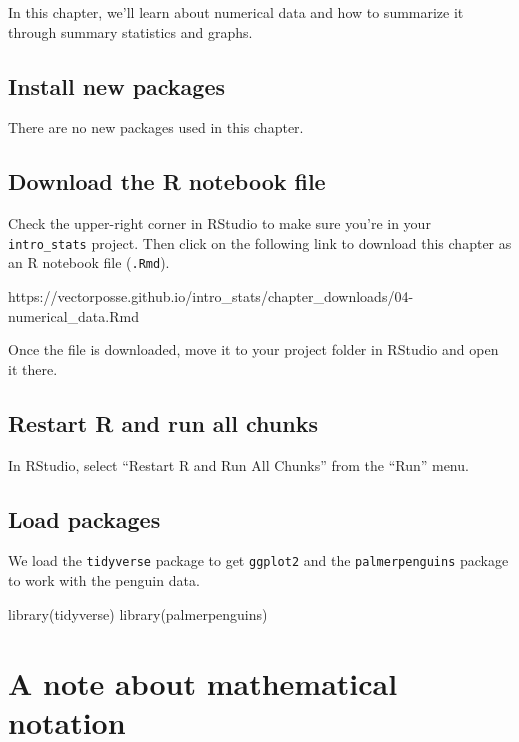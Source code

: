 \documentclass[
]{book}
\newenvironment{Shaded}{\begin{snugshade}}{\end{snugshade}}
\newcommand{\FunctionTok}[1]{\textcolor[rgb]{0.00,0.00,0.00}{#1}}
\newcommand{\NormalTok}[1]{#1}
\begin{document}
In this chapter, we'll learn about numerical data and how to summarize it through summary statistics and graphs.

\hypertarget{numerical-install}{%
\subsection{Install new packages}\label{numerical-install}}

There are no new packages used in this chapter.

\hypertarget{numerical-download}{%
\subsection{Download the R notebook file}\label{numerical-download}}

Check the upper-right corner in RStudio to make sure you're in your \texttt{intro\_stats} project. Then click on the following link to download this chapter as an R notebook file (\texttt{.Rmd}).

https://vectorposse.github.io/intro\_stats/chapter\_downloads/04-numerical\_data.Rmd

Once the file is downloaded, move it to your project folder in RStudio and open it there.

\hypertarget{numerical-restart}{%
\subsection{Restart R and run all chunks}\label{numerical-restart}}

In RStudio, select ``Restart R and Run All Chunks'' from the ``Run'' menu.

\hypertarget{numerical-load}{%
\subsection{Load packages}\label{numerical-load}}

We load the \texttt{tidyverse} package to get \texttt{ggplot2} and the \texttt{palmerpenguins} package to work with the penguin data.

\begin{Shaded}
\begin{Highlighting}[]
\FunctionTok{library}\NormalTok{(tidyverse)}
\FunctionTok{library}\NormalTok{(palmerpenguins)}
\end{Highlighting}
\end{Shaded}

\hypertarget{numerical-notation}{%
\section{A note about mathematical notation}\label{numerical-notation}}
\end{document}
